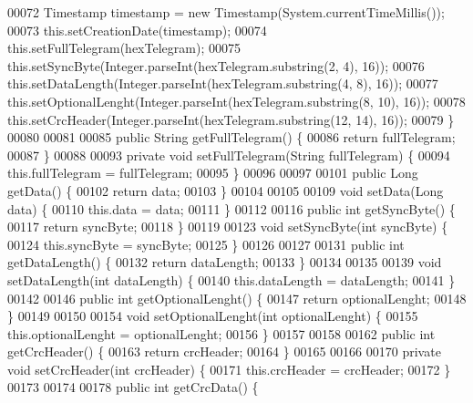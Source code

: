 \begin{DoxyCode}
00072         Timestamp timestamp = \textcolor{keyword}{new} Timestamp(System.currentTimeMillis());
00073         this.setCreationDate(timestamp);
00074         this.setFullTelegram(hexTelegram);
00075         this.setSyncByte(Integer.parseInt(hexTelegram.substring(2, 4), 16));
00076         this.setDataLength(Integer.parseInt(hexTelegram.substring(4, 8), 16));
00077         this.setOptionalLenght(Integer.parseInt(hexTelegram.substring(8, 10), 16));
00078         this.setCrcHeader(Integer.parseInt(hexTelegram.substring(12, 14), 16));
00079     \}
00080 
00081 
00085     \textcolor{keyword}{public} String getFullTelegram() \{
00086         \textcolor{keywordflow}{return} fullTelegram;
00087     \}
00088 
00093     \textcolor{keyword}{private} \textcolor{keywordtype}{void} setFullTelegram(String fullTelegram) \{
00094         this.fullTelegram = fullTelegram;
00095     \}
00096 
00097 
00101     \textcolor{keyword}{public} Long getData() \{
00102         \textcolor{keywordflow}{return} data;
00103     \}
00104 
00105 
00109     \textcolor{keywordtype}{void} setData(Long data) \{
00110         this.data = data;
00111     \}
00112 
00116     \textcolor{keyword}{public} \textcolor{keywordtype}{int} getSyncByte() \{
00117         \textcolor{keywordflow}{return} syncByte;
00118     \}
00119 
00123     \textcolor{keywordtype}{void} setSyncByte(\textcolor{keywordtype}{int} syncByte) \{
00124         this.syncByte = syncByte;
00125     \}
00126 
00127 
00131     \textcolor{keyword}{public} \textcolor{keywordtype}{int} getDataLength() \{
00132         \textcolor{keywordflow}{return} dataLength;
00133     \}
00134 
00135 
00139     \textcolor{keywordtype}{void} setDataLength(\textcolor{keywordtype}{int} dataLength) \{
00140         this.dataLength = dataLength;
00141     \}
00142 
00146     \textcolor{keyword}{public} \textcolor{keywordtype}{int} getOptionalLenght() \{
00147         \textcolor{keywordflow}{return} optionalLenght;
00148     \}
00149 
00150 
00154     \textcolor{keywordtype}{void} setOptionalLenght(\textcolor{keywordtype}{int} optionalLenght) \{
00155         this.optionalLenght = optionalLenght;
00156     \}
00157 
00158 
00162     \textcolor{keyword}{public} \textcolor{keywordtype}{int} getCrcHeader() \{
00163         \textcolor{keywordflow}{return} crcHeader;
00164     \}
00165 
00166 
00170     \textcolor{keyword}{private} \textcolor{keywordtype}{void} setCrcHeader(\textcolor{keywordtype}{int} crcHeader) \{
00171         this.crcHeader = crcHeader;
00172     \}
00173 
00174 
00178     \textcolor{keyword}{public} \textcolor{keywordtype}{int} getCrcData() \{

\end{DoxyCode}
